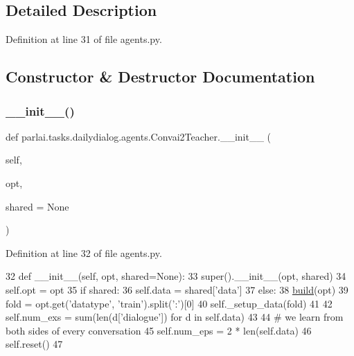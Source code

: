 \subsection{Detailed Description}


Definition at line 31 of file agents.\+py.



\subsection{Constructor \& Destructor Documentation}
\mbox{\label{classparlai_1_1tasks_1_1dailydialog_1_1agents_1_1Convai2Teacher_a8dede379600bb9f0e942059ea2b0d9f0}} 
\subsubsection{\texorpdfstring{\+\_\+\+\_\+init\+\_\+\+\_\+()}{\_\_init\_\_()}}
{\footnotesize\ttfamily def parlai.\+tasks.\+dailydialog.\+agents.\+Convai2\+Teacher.\+\_\+\+\_\+init\+\_\+\+\_\+ (\begin{DoxyParamCaption}\item[{}]{self,  }\item[{}]{opt,  }\item[{}]{shared = {\ttfamily None} }\end{DoxyParamCaption})}



Definition at line 32 of file agents.\+py.


\begin{DoxyCode}
32     \textcolor{keyword}{def }\_\_init\_\_(self, opt, shared=None):
33         super().\_\_init\_\_(opt, shared)
34         self.opt = opt
35         \textcolor{keywordflow}{if} shared:
36             self.data = shared[\textcolor{stringliteral}{'data'}]
37         \textcolor{keywordflow}{else}:
38             \hyperlink{namespaceparlai_1_1mturk_1_1tasks_1_1talkthewalk_1_1download_a8c0fbb9b6dfe127cb8c1bd6e7c4e33fd}{build}(opt)
39             fold = opt.get(\textcolor{stringliteral}{'datatype'}, \textcolor{stringliteral}{'train'}).split(\textcolor{stringliteral}{':'})[0]
40             self.\_setup\_data(fold)
41 
42         self.num\_exs = sum(len(d[\textcolor{stringliteral}{'dialogue'}]) \textcolor{keywordflow}{for} d \textcolor{keywordflow}{in} self.data)
43 
44         \textcolor{comment}{# we learn from both sides of every conversation}
45         self.num\_eps = 2 * len(self.data)
46         self.reset()
47 
\end{DoxyCode}


